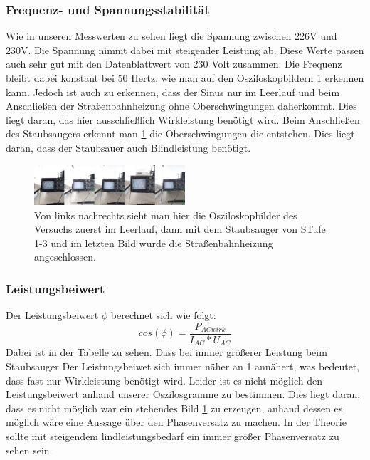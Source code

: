 \subsubsection{Frequenz- und Spannungsstabilität}
Wie in unseren Messwerten zu sehen liegt die Spannung zwischen 226V und 230V. Die Spannung nimmt dabei mit steigender Leistung ab. Diese Werte passen auch sehr gut mit den Datenblattwert von 230 Volt zusammen. Die Frequenz bleibt dabei konstant bei 50 Hertz, wie man auf den Osziloskopbildern \ref{fig:oszi} erkennen kann. Jedoch ist auch zu erkennen, dass der Sinus nur im Leerlauf und beim Anschließen der Straßenbahnheizung ohne Oberschwingungen daherkommt. Dies liegt daran, das hier ausschließlich Wirkleistung benötigt wird. Beim Anschließen des Staubsaugers erkennt man \ref{fig:oszi} die Oberschwingungen die entstehen. Dies liegt daran, dass der Staubsauer auch Blindleistung benötigt.
%
\begin{figure}[!h]
		\centering
		\includegraphics[width=0.5\textwidth]{Abbildungen/MergedImages}
		\caption{Von links nachrechts sieht man hier die Osziloskopbilder des Versuchs zuerst im Leerlauf, dann mit dem Staubsauger von STufe 1-3 und im letzten Bild wurde die Straßenbahnheizung angeschlossen.}
		\label{fig:oszi}
\end{figure}
%
\subsubsection{Leistungsbeiwert}
Der Leistungsbeiwert $ \phi $ berechnet sich wie folgt:
%
\begin{equation}
	cos(\phi)=\frac{ P_{ ACwirk } }{  I_{ AC }*U_{AC }}
\end{equation}
%
Dabei ist in der Tabelle zu sehen. Dass bei immer größerer Leistung beim Staubsauger Der Leistungsbeiwet sich immer näher an 1 annähert, was bedeutet, dass fast nur Wirkleistung benötigt wird. Leider ist es nicht möglich den Leistungsbeiwert anhand unserer Oszilosgramme zu bestimmen. Dies liegt daran, dass es nicht möglich war ein stehendes Bild \ref{fig:oszi}  zu erzeugen, anhand dessen es möglich wäre eine Aussage über den Phasenversatz zu machen. In der Theorie sollte mit steigendem lindleistungsbedarf ein immer größer Phasenversatz zu sehen sein.